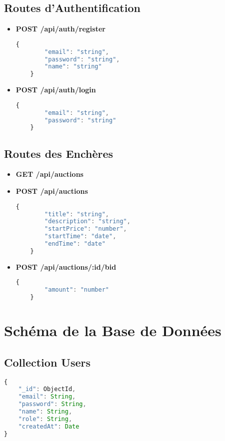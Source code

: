 \subsection{Routes d'Authentification}
\begin{itemize}
    \item \textbf{POST /api/auth/register}
    \begin{lstlisting}[language=JavaScript]
    {
        "email": "string",
        "password": "string",
        "name": "string"
    }
    \end{lstlisting}
    
    \item \textbf{POST /api/auth/login}
    \begin{lstlisting}[language=JavaScript]
    {
        "email": "string",
        "password": "string"
    }
    \end{lstlisting}
\end{itemize}

\subsection{Routes des Enchères}
\begin{itemize}
    \item \textbf{GET /api/auctions}
    \item \textbf{POST /api/auctions}
    \begin{lstlisting}[language=JavaScript]
    {
        "title": "string",
        "description": "string",
        "startPrice": "number",
        "startTime": "date",
        "endTime": "date"
    }
    \end{lstlisting}
    
    \item \textbf{POST /api/auctions/:id/bid}
    \begin{lstlisting}[language=JavaScript]
    {
        "amount": "number"
    }
    \end{lstlisting}
\end{itemize}

\section{Schéma de la Base de Données}
\subsection{Collection Users}
\begin{lstlisting}[language=JavaScript]
{
    "_id": ObjectId,
    "email": String,
    "password": String,
    "name": String,
    "role": String,
    "createdAt": Date
}
\end{lstlisting}

